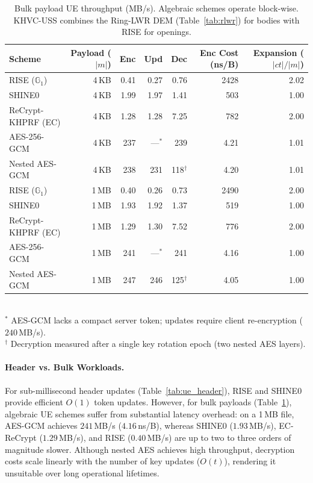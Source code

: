 \begin{table}[htbp]
\centering
\caption{Bulk payload UE throughput (MB/s). Algebraic schemes operate block-wise. KHVC-USS combines the Ring-LWR DEM (Table~\ref{tab:rlwr}) for bodies with RISE for openings.}
\label{tab:ue_bulk}
\small
\begin{tabular}{@{}lrrrrrr@{}}
\toprule
Scheme & Payload ($|m|$) & Enc & Upd & Dec & Enc Cost (ns/B) & Expansion ($|ct|/|m|$) \\
\midrule
RISE ($\mathbb{G}_1$)     & 4\,KB & 0.41 & 0.27 & 0.76 & 2428 & 2.02 \\
SHINE0                   & 4\,KB & 1.99 & 1.97 & 1.41 & 503  & 1.00 \\
ReCrypt-KHPRF (EC)       & 4\,KB & 1.28 & 1.28 & 7.25 & 782  & 2.00 \\
AES-256-GCM              & 4\,KB & 237  & ---$^*$ & 239 & 4.21 & 1.01 \\
Nested AES-GCM           & 4\,KB & 238  & 231  & 118$^{\dagger}$ & 4.20 & 1.01 \\
\midrule
RISE ($\mathbb{G}_1$)     & 1\,MB & 0.40 & 0.26 & 0.73 & 2490 & 2.00 \\
SHINE0                   & 1\,MB & 1.93 & 1.92 & 1.37 & 519  & 1.00 \\
ReCrypt-KHPRF (EC)       & 1\,MB & 1.29 & 1.30 & 7.52 & 776  & 2.00 \\
AES-256-GCM              & 1\,MB & 241  & ---$^*$ & 241 & 4.16 & 1.00 \\
Nested AES-GCM           & 1\,MB & 247  & 246  & 125$^{\dagger}$ & 4.05 & 1.00 \\
\bottomrule
\end{tabular}\\[0.3em]
{\scriptsize $^*$ AES-GCM lacks a compact server token; updates require client re-encryption ($240$\,MB/s).\\
$^{\dagger}$ Decryption measured after a single key rotation epoch (two nested AES layers).}
\end{table}

\paragraph{Header vs. Bulk Workloads.}
For sub-millisecond header updates (Table~\ref{tab:ue_header}), RISE and SHINE0 provide efficient $O(1)$ token updates. However, for bulk payloads (Table~\ref{tab:ue_bulk}), algebraic UE schemes suffer from substantial latency overhead: on a 1\,MB file, AES-GCM achieves $241$\,MB/s ($4.16$\,ns/B), whereas SHINE0 ($1.93$\,MB/s), EC-ReCrypt ($1.29$\,MB/s), and RISE ($0.40$\,MB/s) are up to two to three orders of magnitude slower. Although nested AES achieves high throughput, decryption costs scale linearly with the number of key updates ($O(t)$), rendering it unsuitable over long operational lifetimes.

